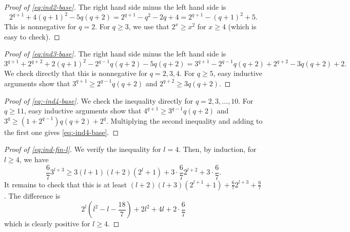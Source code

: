 \documentclass[10pt]{article}
\newcommand{\1}{\textbf{1}}
\theoremstyle{remark}
\theoremstyle{definition}
\begin{document}
\begin{proof}[Proof of \eqref{eq:ind2-base}]
The right hand side minus the left hand side is
\[2^{q+1}+4(q+1)^2-5q(q+2) = 2^{q+1}-q^2-2q+4 = 2^{q+1}-(q+1)^2+5.\]
This is nonnegative for $q=2$. For $q \geq 3$, we use that $2^x \geq x^2$ for $x \geq 4$ (which is easy to check).
\end{proof}

\begin{proof}[Proof of \eqref{eq:ind3-base}]
The right hand side minus the left hand side is
\[
3^{q+1}+2^{q+2}+2(q+1)^2-2^{q-1}q(q+2)-5q(q+2) = 3^{q+1}-2^{q-1}q(q+2)+2^{q+2}-3q(q+2)+2.
\]
We check directly that this is nonnegative for $q = 2, 3, 4$. For $q \geq 5$, easy inductive arguments show that $3^{q+1} \geq 2^{q-1}q(q+2)$ and $2^{q+2} \geq 3q(q+2)$.
\end{proof}

\begin{proof}[Proof of \eqref{eq:-ind4-base}]
We check the inequality directly for $q = 2, 3, \dots, 10$. For $q \geq 11$, easy inductive arguments show that $4^{q+1}\geq 3^{q-1}q(q+2)$ and $3^q \geq (1+2^{q-1})q(q+2)+2^q$. Multiplying the second inequality and adding to the first one gives \eqref{eq:-ind4-base}.
\end{proof}

\begin{proof}[Proof of \eqref{eq:ind-fin-l}]
We verify the inequality for $l = 4$. Then, by induction, for $l \geq 4$, we have
\[
\frac{6}{7}3^{l+3} \geq 3(l+1)(l+2)(2^l+1) + 3\cdot\frac{6}{7}2^{l+2}+3\cdot\frac{6}{7}.
\]
It remains to check that this is at least $(l+2)(l+3)(2^{l+1}+1) + \frac{6}{7}2^{l+3}+\frac{6}{7}$. The difference is
\[
2^l\left(l^2-l-\frac{18}{7}\right) + 2l^2+4l+2\cdot\frac{6}{7}
\]
which is clearly positive for $l \geq 4$.
\end{proof}
\end{document}
